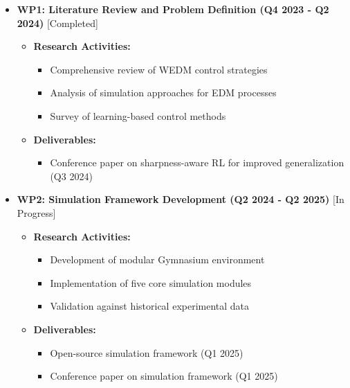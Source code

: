 \documentclass[11pt]{article}
\begin{document}
\begin{itemize}
    \item \textbf{WP1: Literature Review and Problem Definition (Q4 2023 - Q2 2024)} [Completed]
        \begin{itemize}
            \item \textbf{Research Activities:}
                \begin{itemize}
                    \item Comprehensive review of WEDM control strategies
                    \item Analysis of simulation approaches for EDM processes
                    \item Survey of learning-based control methods
                \end{itemize}
            \item \textbf{Deliverables:}
                \begin{itemize}
                    \item Conference paper on sharpness-aware RL for improved generalization (Q3 2024)
                \end{itemize}
        \end{itemize}

    \item \textbf{WP2: Simulation Framework Development (Q2 2024 - Q2 2025)} [In Progress]
        \begin{itemize}
            \item \textbf{Research Activities:}
                \begin{itemize}
                    \item Development of modular Gymnasium environment
                    \item Implementation of five core simulation modules
                    \item Validation against historical experimental data
                \end{itemize}
            \item \textbf{Deliverables:}
                \begin{itemize}
                    \item Open-source simulation framework (Q1 2025)
                    \item Conference paper on simulation framework (Q1 2025)
                \end{itemize}
        \end{itemize}


\end{itemize}
\end{document}

